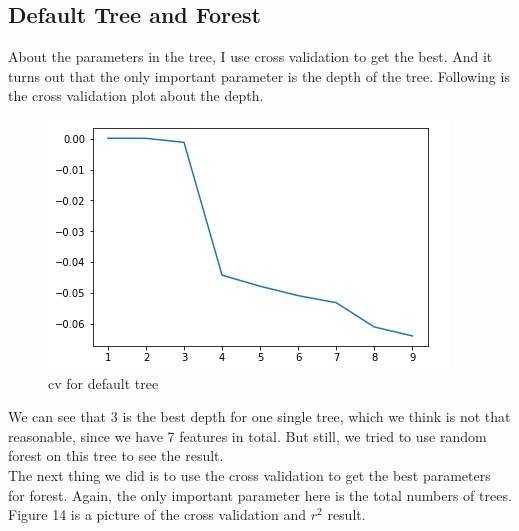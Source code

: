 \documentclass[onecolumn]{article}
\begin{document}
\subsection{Default Tree and Forest}
\indent About the parameters in the tree, I use cross validation to get the best. And it turns out that the only important parameter is the depth of the tree. Following is the cross validation plot about the depth.

\begin{figure}[H]
\centering
\includegraphics[scale=0.5]{depth_on_default_tree.png}
\caption{cv for default tree}
\label{fig:label}
\end{figure}

\indent We can see that 3 is the best depth for one single tree, which we think is not that reasonable, since we have 7 features in total. But still, we tried to use random forest on this tree to see the result.\\

\indent The next thing we did is to use the cross validation to get the best parameters for forest. Again, the only important parameter here is the total numbers of trees. Figure 14 is a picture of the cross validation and $r^2$ result.
\end{document}
